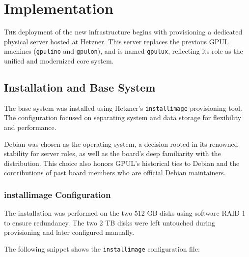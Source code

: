 %

\chapter{Implementation}
\label{chap:implementation}

\lettrine{T}{he} deployment of the new infrastructure begins with provisioning a dedicated physical server hosted at Hetzner\cite{hetzner-server-bidding}. This server replaces the previous GPUL machines (\texttt{gpulino} and \texttt{gpulon}), and is named \texttt{gpulux}, reflecting its role as the unified and modernized core system.

\section{Installation and Base System}

The base system was installed using Hetzner's \texttt{installimage}\cite{hetzner-installimage} provisioning tool. The configuration focused on separating system and data storage for flexibility and performance.

Debian was chosen as the operating system, a decision rooted in its renowned stability for server roles, as well as the board's deep familiarity with the distribution. This choice also honors GPUL's historical ties to Debian and the contributions of past board members who are official Debian maintainers\cite{berto-debian-page}.

\subsection*{installimage Configuration}

The installation was performed on the two 512 GB disks using software RAID 1 to ensure redundancy. The two 2 TB disks were left untouched during provisioning and later configured manually.

The following snippet shows the \texttt{installimage} configuration file:

